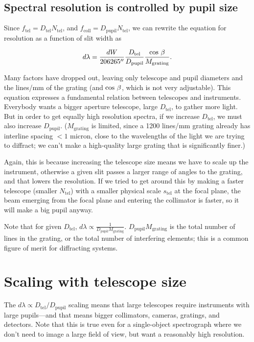 \documentclass[12pt]{article}
\newcommand{\subscript}[1]{\mathrm{#1}}
\newcommand{\tel}{\subscript{tel}}
\newcommand{\pupil}{\subscript{pupil}}
\newcommand{\coll}{\subscript{coll}}
\newcommand{\grating}{\subscript{grating}}
\begin{document}
\subsection{Spectral resolution is controlled by pupil size}

Since $f_{\tel} = D_{\tel} N_{\tel}$, and $f_{\coll} = D_{\pupil}  N_{\tel}$,
we can rewrite the equation for resolution as a function of 
slit width as

$$ d\lambda = \frac{dW}{206265''}  \frac{D_{\tel}}{D_{\pupil}} \frac{{\rm cos}~\beta}{M_{\grating}}. $$

Many factors have dropped out, leaving only telescope and
pupil diameters and the lines/mm of the grating (and ${\rm cos}~\beta$,
which is not very adjustable).
This equation expresses a fundamental relation between telescopes
and instruments.
Everybody wants a bigger aperture telescope, large $D_{\tel}$, to
gather more light.  But in order to get equally
high resolution spectra, if we increase $D_{\tel}$,
we must also increase $D_{\pupil}$.  ($M_{\grating}$ is limited, since a 
1200 lines/mm grating already has interline spacing $<1$ micron,
close to the wavelengths of the light we are trying to diffract;
we can't make a high-quality large grating that is significantly finer.)

Again, this is because increasing the telescope size
means we have to scale up the instrument, otherwise a given
slit passes a larger range of angles to the grating, and that
lowers the resolution.  If we tried to get around this by
making a faster telescope (smaller $N_{\tel}$) with a smaller physical 
scale $s_{\tel}$ at the focal plane, the beam emerging from the focal 
plane and entering the collimator is faster, so it will make a
big pupil anyway.

Note that for given $D_{\tel}$,
$d\lambda \propto \frac{1}{D_{\pupil} M_{\grating}}$.  
$D_{\pupil} M_{\grating}$ is the total number of lines in the grating,
or the total number of interfering elements; this is a common
figure of merit for diffracting systems.

\section{Scaling with telescope size}

The $d\lambda \propto D_{\tel}/D_{\pupil}$ scaling means that large telescopes 
require 
instruments with large pupils---and that means bigger collimators,
cameras, gratings, and detectors.  Note that this is true even for a
single-object spectrograph where we don't need to image a large field
of view, but want a reasonably high resolution.  
\end{document}
